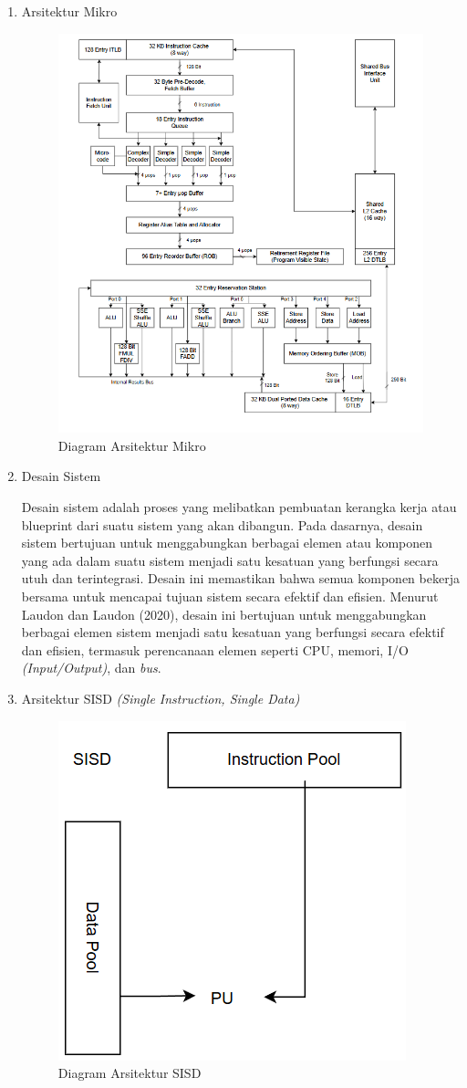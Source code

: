 \documentclass[12pt]{article}
\begin{document}
\begin{enumerate}
    \item Arsitektur Mikro

        \noindent
        \begin{figure}[H]
            \centering
            \includegraphics[width=0.4\linewidth]{asset/image4.png}
            \caption{Diagram Arsitektur Mikro}
            \label{fig:Diagram-Arsitektur-Mikro}
        \end{figure}
    
    \item Desain Sistem
    \par Desain sistem adalah proses yang melibatkan pembuatan kerangka kerja atau blueprint dari suatu sistem yang akan dibangun. Pada dasarnya, desain sistem bertujuan untuk menggabungkan berbagai elemen atau komponen yang ada dalam suatu sistem menjadi satu kesatuan yang berfungsi secara utuh dan terintegrasi. Desain ini memastikan bahwa semua komponen bekerja bersama untuk mencapai tujuan sistem secara efektif dan efisien. Menurut Laudon dan Laudon (2020), desain ini bertujuan untuk menggabungkan berbagai elemen sistem menjadi satu kesatuan yang berfungsi secara efektif dan efisien, termasuk perencanaan elemen seperti CPU, memori, I/O \textit{(Input/Output)}, dan \textit{bus}. 

    \item Arsitektur SISD \textit{(Single Instruction, Single Data)}

        \noindent
        \begin{figure}[H]
            \centering
            \includegraphics[width=0.4\linewidth]{asset/image6.png}
            \caption{Diagram Arsitektur SISD}
            \label{fig:Diagram-Arsitektur-SISD}
        \end{figure}
        

\end{enumerate}
\end{document}
